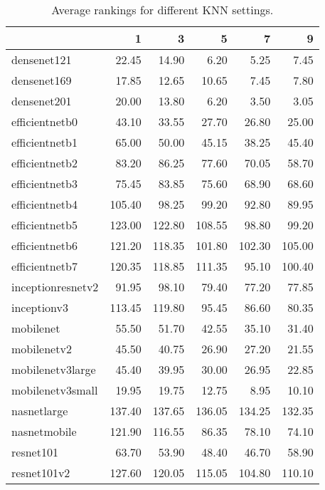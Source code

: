 \begin{table}[H]
\centering
\caption{Average rankings for different KNN settings.}
\begin{tabular}{lrrrrr}
\toprule
{} &       1 &       3 &       5 &       7 &       9 \\
\midrule
densenet121       &   22.45 &   14.90 &    6.20 &    5.25 &    7.45 \\
densenet169       &   17.85 &   12.65 &   10.65 &    7.45 &    7.80 \\
densenet201       &   20.00 &   13.80 &    6.20 &    3.50 &    3.05 \\
efficientnetb0    &   43.10 &   33.55 &   27.70 &   26.80 &   25.00 \\
efficientnetb1    &   65.00 &   50.00 &   45.15 &   38.25 &   45.40 \\
efficientnetb2    &   83.20 &   86.25 &   77.60 &   70.05 &   58.70 \\
efficientnetb3    &   75.45 &   83.85 &   75.60 &   68.90 &   68.60 \\
efficientnetb4    &  105.40 &   98.25 &   99.20 &   92.80 &   89.95 \\
efficientnetb5    &  123.00 &  122.80 &  108.55 &   98.80 &   99.20 \\
efficientnetb6    &  121.20 &  118.35 &  101.80 &  102.30 &  105.00 \\
efficientnetb7    &  120.35 &  118.85 &  111.35 &   95.10 &  100.40 \\
inceptionresnetv2 &   91.95 &   98.10 &   79.40 &   77.20 &   77.85 \\
inceptionv3       &  113.45 &  119.80 &   95.45 &   86.60 &   80.35 \\
mobilenet         &   55.50 &   51.70 &   42.55 &   35.10 &   31.40 \\
mobilenetv2       &   45.50 &   40.75 &   26.90 &   27.20 &   21.55 \\
mobilenetv3large  &   45.40 &   39.95 &   30.00 &   26.95 &   22.85 \\
mobilenetv3small  &   19.95 &   19.75 &   12.75 &    8.95 &   10.10 \\
nasnetlarge       &  137.40 &  137.65 &  136.05 &  134.25 &  132.35 \\
nasnetmobile      &  121.90 &  116.55 &   86.35 &   78.10 &   74.10 \\
resnet101         &   63.70 &   53.90 &   48.40 &   46.70 &   58.90 \\
resnet101v2       &  127.60 &  120.05 &  115.05 &  104.80 &  110.10 \\

\end{tabular}
\end{table}
